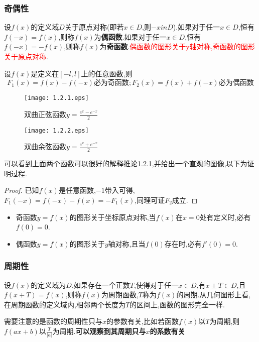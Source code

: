 \documentclass[12pt, a4paper, oneside, UTF8]{ctexbook}  %
\begin{document}
\subsubsection{奇偶性}
\begin{defn}{}{}
    设$f(x)$的定义域$D$关于原点对称(即若$x \in D$,则$-x in D$).如果对于任一$x \in D$,恒有$f(-x)=f(x)$,则称$f(x)$为\textbf{偶函数}.如果对于任一$x \in D$,恒有$f(-x)=-f(x)$,则称$f(x)$为\textbf{奇函数}.\textcolor{red}{偶函数的图形关于y轴对称,奇函数的图形关于原点对称}.\equiv
\end{defn}
\begin{corollary}{}{}
    设$f(x)$是定义在$[-l,l]$上的任意函数,则
    $$
        F_1(x)=f(x)-f(-x)\text{必为奇函数};F_2(x)=f(x)+f(-x)\text{必为偶函数}
    $$
\end{corollary}
\begin{figure}[htbp]
    \begin{minipage}[t]{0.5\linewidth}
        \centering
        \texttt{[image: 1.2.1.eps]}
        \caption{双曲正弦函数$y=\frac{e^x-e^{-x}}{2}$}
    \end{minipage}%
    \begin{minipage}[t]{0.5\linewidth}
        \centering
        \texttt{[image: 1.2.2.eps]}
        \caption{双曲余弦函数$y=\frac{e^x+e^{-x}}{2}$}
    \end{minipage}
\end{figure}
可以看到上面两个函数可以很好的解释推论1.2.1,并给出一个直观的图像,以下为证明过程.
\begin{proof}
    已知$f(x)$是任意函数,$-1$带入可得,$F_1(-x)=f(-x)-f(x)=-F_1(x)$,同理可证$F_2$成立.
\end{proof}
\begin{itemize}
    \item 奇函数$y=f(x)$的图形关于坐标原点对称,当$f(x)$在$x=0$处有定义时,必有$f(0)=0$.
    \item 偶函数$y=f(x)$的图形关于$y$轴对称,且当$f(0)$存在时,必有$f'(0)=0$.
\end{itemize}
\subsubsection{周期性}
\begin{defn}{}{}
    设$f(x)$的定义域为$D$,如果存在一个正数$T$,使得对于任一$x \in D$,有$x \pm T \in D$,且$f(x+T)=f(x)$,则称$f(x)$为周期函数,$T$称为$f(x)$的周期.从几何图形上看,在周期函数的定义域内,相邻两个长度为$T$的区间上,函数的图形完全一样.
\end{defn}
需要注意的是函数的周期性只与$x$的参数有关,比如若函数$f(x)$以$T$为周期,则$f(ax+b)$以$\frac{T}{|a|}$为周期.\textbf{可以观察到其周期只与$x$的系数有关}
\end{document}
